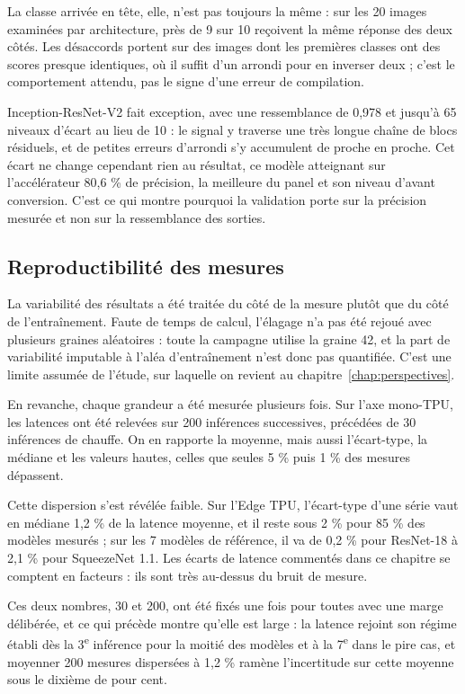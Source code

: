 \documentclass[11pt,a4paper]{report}
\begin{document}
La classe arrivée en tête, elle, n'est pas toujours la même : sur les 20 images examinées par architecture, près de 9 sur 10 reçoivent la même réponse des deux côtés. Les désaccords portent sur des images dont les premières classes ont des scores presque identiques, où il suffit d'un arrondi pour en inverser deux ; c'est le comportement attendu, pas le signe d'une erreur de compilation.

Inception-ResNet-V2 fait exception, avec une ressemblance de 0,978 et jusqu'à 65 niveaux d'écart au lieu de 10 : le signal y traverse une très longue chaîne de blocs résiduels, et de petites erreurs d'arrondi s'y accumulent de proche en proche. Cet écart ne change cependant rien au résultat, ce modèle atteignant sur l'accélérateur 80,6 \% de précision, la meilleure du panel et son niveau d'avant conversion. C'est ce qui montre pourquoi la validation porte sur la précision mesurée et non sur la ressemblance des sorties.

\subsection{Reproductibilité des mesures}

La variabilité des résultats a été traitée du côté de la mesure plutôt que du côté de l'entraînement. Faute de temps de calcul, l'élagage n'a pas été rejoué avec plusieurs graines aléatoires : toute la campagne utilise la graine 42, et la part de variabilité imputable à l'aléa d'entraînement n'est donc pas quantifiée. C'est une limite assumée de l'étude, sur laquelle on revient au chapitre~\ref{chap:perspectives}.

En revanche, chaque grandeur a été mesurée plusieurs fois. Sur l'axe mono-TPU, les latences ont été relevées sur 200 inférences successives, précédées de 30 inférences de chauffe. On en rapporte la moyenne, mais aussi l'écart-type, la médiane et les valeurs hautes, celles que seules 5 \% puis 1 \% des mesures dépassent.

Cette dispersion s'est révélée faible. Sur l'Edge TPU, l'écart-type d'une série vaut en médiane 1,2 \% de la latence moyenne, et il reste sous 2 \% pour 85 \% des modèles mesurés ; sur les 7 modèles de référence, il va de 0,2 \% pour ResNet-18 à 2,1 \% pour SqueezeNet 1.1. Les écarts de latence commentés dans ce chapitre se comptent en facteurs : ils sont très au-dessus du bruit de mesure.

Ces deux nombres, 30 et 200, ont été fixés une fois pour toutes avec une marge délibérée, et ce qui précède montre qu'elle est large : la latence rejoint son régime établi dès la 3\textsuperscript{e} inférence pour la moitié des modèles et à la 7\textsuperscript{e} dans le pire cas, et moyenner 200 mesures dispersées à 1,2 \% ramène l'incertitude sur cette moyenne sous le dixième de pour cent.
\end{document}
